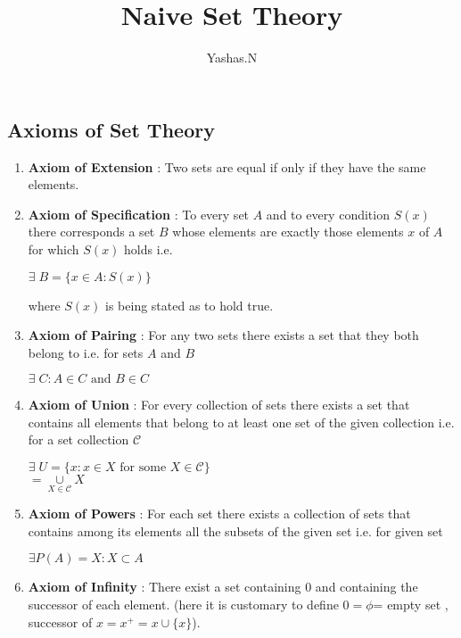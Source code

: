\documentclass[11pt]{extarticle}
\author{Yashas.N}
\title{Naive Set Theory}
\date{}
\newcommand{\w}[1]{\text{#1}}
\begin{document}
	\maketitle
	\boldmath
	
\begin{multicols}{2}
	
\section{Axioms of Set Theory }
\begin{enumerate}
	\item \textbf{Axiom of Extension} : Two sets are equal if only if they have the same elements.
	\item \textbf{Axiom of Specification} : To every set $A$ and to every condition $S(x)$ there corresponds a set $B$ whose elements are exactly those elements $x$ of $A$ for which $S(x)$ holds i.e.
	\begin{center}
		$\exists \; B=\{x\in A:S(x)\}$
	\end{center}
	where $S(x)$ is being stated as to hold true.
	\item \textbf{Axiom of Pairing} : For any two sets there exists a set that they both belong to i.e. for sets $A$ and $B$
	\begin{center}
		$\exists \; C : A\in C \w{ and } B\in C $
	\end{center}
	\item \textbf{Axiom of Union} : For every collection of sets there exists a set that contains all elements that belong to at least one set of the given collection i.e. for a set collection $\mathscr{C}$ 
	\begin{center}
		$\exists \; U =\{ x: x\in X \w{ for some }X \in \mathscr{C}\}$\\
		$= \underset{X\in \mathscr{C}}{\cup} X$
	\end{center}
	\item \textbf{Axiom of Powers} : For each set there exists a collection of sets that contains among its elements all the subsets of the given set i.e. 
	for given set 
	\begin{center}
		$\exists P(A)={X:X\subset A}$
	\end{center}
	\item \textbf{Axiom of Infinity} : There exist a set containing $0$ and containing the successor of each element. (here it is customary to define $0=\phi$= empty set , successor of $x=x^+=x \cup \{x\}$).
	

\end{enumerate}
\end{multicols}
\end{document}
